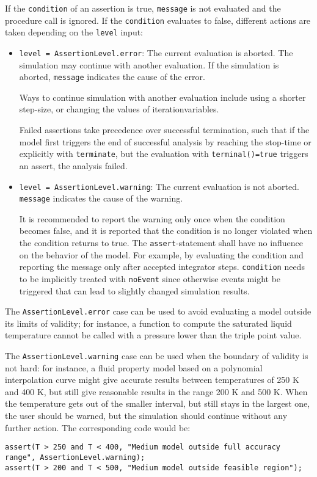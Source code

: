 If the \lstinline!condition! of an assertion is true, \lstinline!message! is not evaluated and the procedure call is ignored.
If the \lstinline!condition! evaluates to false, different actions are taken depending on the \lstinline!level! input:
\begin{itemize}
\item
  \lstinline!level = AssertionLevel.error!:
  The current evaluation is aborted.
  The simulation may continue with another evaluation.
  If the simulation is aborted, \lstinline!message! indicates the cause of the error.
  \begin{nonnormative}
  Ways to continue simulation with another evaluation include using a shorter step-size, or changing the values of iterationvariables.
  \end{nonnormative}
  Failed assertions take precedence over successful termination, such that if the model first triggers the end of successful analysis by reaching the stop-time or explicitly with \lstinline!terminate!, but the evaluation with \lstinline!terminal()=true! triggers an assert, the analysis failed.
\item
  \lstinline!level = AssertionLevel.warning!:
  The current evaluation is not aborted.
  \lstinline!message! indicates the cause of the warning.
  \begin{nonnormative}
  It is recommended to report the warning only once when the condition becomes false, and it is reported that the condition is no longer violated when the condition returns to true.
  The \lstinline!assert!-statement shall have no influence on the behavior of the model.
  For example, by evaluating the condition and reporting the message only after accepted integrator steps.
  \lstinline!condition! needs to be implicitly treated with \lstinline!noEvent! since otherwise events might be triggered that can lead to slightly changed simulation results.
  \end{nonnormative}
\end{itemize}

\begin{nonnormative}
The \lstinline!AssertionLevel.error! case can be used to avoid evaluating a
model outside its limits of validity; for instance, a function to
compute the saturated liquid temperature cannot be called with a
pressure lower than the triple point value.

The \lstinline!AssertionLevel.warning! case can be used when the boundary of
validity is not hard: for instance, a fluid property model based on a
polynomial interpolation curve might give accurate results between
temperatures of 250 K and 400 K, but still give reasonable results in
the range 200 K and 500 K. When the temperature gets out of the smaller
interval, but still stays in the largest one, the user should be warned,
but the simulation should continue without any further action. The
corresponding code would be:
\begin{lstlisting}[language=modelica]
assert(T > 250 and T < 400, "Medium model outside full accuracy range", AssertionLevel.warning);
assert(T > 200 and T < 500, "Medium model outside feasible region");
\end{lstlisting}
\end{nonnormative}

